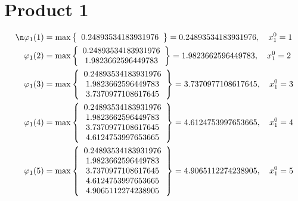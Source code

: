 \documentclass{article}
\begin{document}
\section{Product 1}
\begin{align*}
\n  
  
\varphi_{1}(1) &= \max \left\{ \begin{array}{c}
0.24893534183931976
\end{array} \right\} = 0.24893534183931976, \quad x_{1}^0 = 1\\
  
  
  
  
\varphi_{1}(2) &= \max \left\{ \begin{array}{c}
0.24893534183931976 \\
 1.9823662596449783
\end{array} \right\} = 1.9823662596449783, \quad x_{1}^0 = 2\\
  
  
  
  
\varphi_{1}(3) &= \max \left\{ \begin{array}{c}
0.24893534183931976 \\
 1.9823662596449783 \\
 3.7370977108617645
\end{array} \right\} = 3.7370977108617645, \quad x_{1}^0 = 3\\
  
  
  
  
\varphi_{1}(4) &= \max \left\{ \begin{array}{c}
0.24893534183931976 \\
 1.9823662596449783 \\
 3.7370977108617645 \\
 4.6124753997653665
\end{array} \right\} = 4.6124753997653665, \quad x_{1}^0 = 4\\
  
  
  
  
\varphi_{1}(5) &= \max \left\{ \begin{array}{c}
0.24893534183931976 \\
 1.9823662596449783 \\
 3.7370977108617645 \\
 4.6124753997653665 \\
 4.9065112274238905
\end{array} \right\} = 4.9065112274238905, \quad x_{1}^0 = 5\\
  
  
  

\end{align*}
\end{document}
